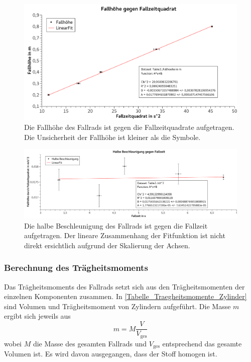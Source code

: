 \documentclass[
	a4paper,
	12pt,
	pagesize,
	ngerman
]{scrartcl}
\begin{document}
	\begin{figure}[tb]
		\includegraphics[width=1\textwidth]{HoeheGegenZeitquadrat} %
		\centering
		\caption{Die Fallhöhe des Fallrads ist gegen die Fallzeitquadrate aufgetragen. Die Unsicherheit der Fallhöhe ist kleiner als die Symbole.}
		\label{HoeheGegenZeitquadrat}
		\centering
	\end{figure}
	\begin{figure}[tb]
		\includegraphics[width=1\textwidth]{BeschleunigungGegenZeit} %
		\centering
		\caption{Die halbe Beschleunigung des Fallrads ist gegen die Fallzeit aufgetragen. Der lineare Zusammenhang der Fitfunktion ist nicht direkt ersichtlich aufgrund der Skalierung der Achsen.}
		\label{BeschleunigungGegenZeit}
		\centering
	\end{figure}



	\subsubsection*{Berechnung des Trägheitsmoments}
	Das Trägheitsmoments des Fallrads setzt sich aus den Trägheitsmomenten der einzelnen Komponenten zusammen.  %
	In \cref{Tabelle_Traegheitsmomente_Zylinder} sind Volumen und Trägheitsmoment von Zylindern aufgeführt. 
	Die Masse $m$ ergibt sich jeweils aus 
	\begin{equation}
		m = M \frac{V}{V_\text{ges}} 
	\end{equation}
	wobei $M$ die Masse des gesamten Fallrads und $V_\text{ges}$ entsprechend das gesamte Volumen ist. Es wird davon ausgegangen, dass der Stoff homogen ist. %
\end{document}
